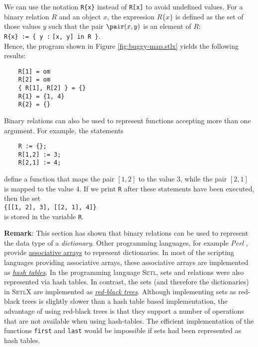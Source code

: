 We can use the notation  \texttt{R\{x\}} instead of \texttt{R[x]} to avoid undefined values.
For a binary relation $R$ and an object $x$, the expression $R\{x\}$ is defined as the set of those values $y$
such that the pair $\pair(x,y)$ is an element of $R$: 
\\[0.2cm]
\hspace*{1.3cm} 
\texttt{R\{x\} := \{ y :$\;$[x, y] in R \}}.
\\[0.2cm]
Hence, the  program shown in Figure \ref{fig:buggy-map.stlx} yields the following results:
\begin{verbatim}
    R[1] = om
    R[2] = om
    { R[1], R[2] } = {}
    R{1} = {1, 4}
    R{2} = {}
\end{verbatim}
Binary relations can also be used to represent functions accepting more than one argument.  For example, the
statements
\begin{verbatim}
    R := {};
    R[1,2] := 3;
    R[2,1] := 4;
\end{verbatim}
define a function that maps the pair $[1,2]$ to the value $3$, while the pair $[2,1]$ is mapped to
the value $4$.  If we print \texttt{R} after these statements have been executed, then the set
\\[0.2cm]
\hspace*{1.3cm}
\texttt{\{[[1, 2], 3], [[2, 1], 4]\}}
\\[0.2cm]
is stored in the variable \texttt{R}.
\vspace*{0.2cm}

\noindent
\textbf{Remark}:
This section has shown that binary relations can be used to represent the data type of a
\emph{dictionary}.  Other programming languages, for example \textsl{Perl} \cite{Wall92},
provide \href{https://en.wikipedia.org/wiki/Associative_array}{associative arrays} to represent dictionaries.
In most of the scripting languages 
providing associative arrays, these associative arrays are implemented as 
\href{http://en.wikipedia.org/wiki/Hash_table}{\emph{hash tables}}.  In the programming language
\textsc{Setl}, sets and relations were also represented via hash tables.
In contrast, the sets (and therefore the dictionaries) in \textsc{SetlX} are implemented as 
\href{http://en.wikipedia.org/wiki/Red-black_tree}{\emph{red-black trees}}.
Although implementing sets as red-black trees is slightly slower than a hash table based
implementation, the advantage of using red-black trees is that they support a number of operations
that are not available when using hash-tables.  The efficient implementation of the functions \texttt{first}
and \texttt{last} would be impossible if sets had been represented as hash tables.


